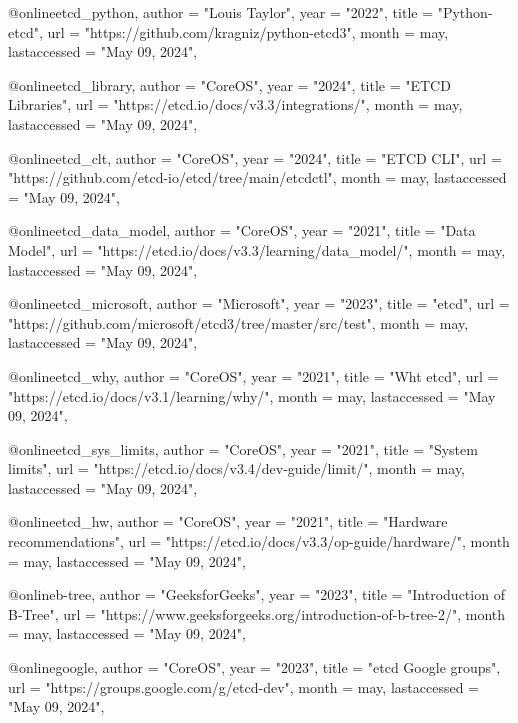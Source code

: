 @online{etcd_python,
  author =       "Louis Taylor",
  year =         "2022",
  title =        "Python-etcd",
  url =          "https://github.com/kragniz/python-etcd3",
  month =        may,
  lastaccessed = "May 09, 2024",
}

@online{etcd_library,
  author =       "CoreOS",
  year =         "2024",
  title =        "ETCD Libraries",
  url =          "https://etcd.io/docs/v3.3/integrations/",
  month =        may,
  lastaccessed = "May 09, 2024",
}

@online{etcd_clt,
  author =       "CoreOS",
  year =         "2024",
  title =        "ETCD CLI",
  url =          "https://github.com/etcd-io/etcd/tree/main/etcdctl",
  month =        may,
  lastaccessed = "May 09, 2024",
}

@online{etcd_data_model,
  author =       "CoreOS",
  year =         "2021",
  title =        "Data Model",
  url =          "https://etcd.io/docs/v3.3/learning/data_model/",
  month =        may,
  lastaccessed = "May 09, 2024",
}

@online{etcd_microsoft,
  author =       "Microsoft",
  year =         "2023",
  title =        "etcd",
  url =          "https://github.com/microsoft/etcd3/tree/master/src/test",
  month =        may,
  lastaccessed = "May 09, 2024",
}

@online{etcd_why,
  author =       "CoreOS",
  year =         "2021",
  title =        "Wht etcd",
  url =          "https://etcd.io/docs/v3.1/learning/why/",
  month =        may,
  lastaccessed = "May 09, 2024",
}

@online{etcd_sys_limits,
  author =       "CoreOS",
  year =         "2021",
  title =        "System limits",
  url =          "https://etcd.io/docs/v3.4/dev-guide/limit/",
  month =        may,
  lastaccessed = "May 09, 2024",
}

@online{etcd_hw,
  author =       "CoreOS",
  year =         "2021",
  title =        "Hardware recommendations",
  url =          "https://etcd.io/docs/v3.3/op-guide/hardware/",
  month =        may,
  lastaccessed = "May 09, 2024",
}

@online{b-tree,
  author =       "GeeksforGeeks",
  year =         "2023",
  title =        "Introduction of B-Tree",
  url =          "https://www.geeksforgeeks.org/introduction-of-b-tree-2/",
  month =        may,
  lastaccessed = "May 09, 2024",
}

@online{google,
  author =       "CoreOS",
  year =         "2023",
  title =        "etcd Google groups",
  url =          "https://groups.google.com/g/etcd-dev",
  month =        may,
  lastaccessed = "May 09, 2024",
}

